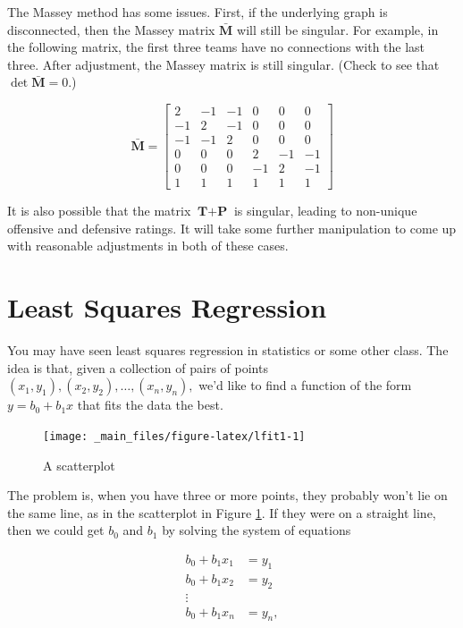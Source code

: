 \documentclass[
]{book}
\theoremstyle{definition}
\theoremstyle{definition}
\theoremstyle{definition}
\theoremstyle{definition}
\theoremstyle{remark}
\begin{document}
The Massey method has some issues. First, if the underlying graph is disconnected, then the Massey matrix \(\bar{\textbf{M}}\) will still be singular. For example, in the following matrix, the first three teams have no connections with the last three. After adjustment, the Massey matrix is still singular. (Check to see that \(\det \bar{\mathbf{M}}=0\).)

\[\bar{\mathbf{M}}=\left[\begin{array}{rrrrrr}2 & -1 & -1 & 0 & 0 & 0\\-1 & 2 & -1 & 0 & 0 & 0\\-1 & -1 & 2 & 0 & 0 & 0\\0 & 0 & 0 & 2 & -1 & -1\\0 & 0 & 0 & -1 & 2 & -1\\1 & 1 & 1 & 1 & 1 & 1\end{array}\right]
\]

It is also possible that the matrix \(\textbf{T}+\textbf{P}\) is singular, leading to non-unique offensive and defensive ratings. It will take some further manipulation to come up with reasonable adjustments in both of these cases.

\section{Least Squares Regression}\label{LSRSec}

You may have seen least squares regression in statistics or some other class. The idea is that, given a collection of pairs of points \((x_1,y_1),(x_2,y_2),\dots,(x_n,y_n),\) we'd like to find a function of the form \(y=b_0+b_1x\) that fits the data the best.

\begin{figure}

{\centering \texttt{[image: \_main\_files/figure-latex/lfit1-1]} 

}

\caption{A scatterplot}\label{fig:lfit1}
\end{figure}

The problem is, when you have three or more points, they probably won't lie on the same line, as in the scatterplot in Figure \ref{fig:lfit1}. If they were on a straight line, then we could get \(b_0\) and \(b_1\) by solving the system of equations

\begin{align*}
    b_0+b_1x_1&=y_1\\
    b_0+b_1x_2&=y_2\\
    \vdots &\\
    b_0+b_1x_n&=y_n,
\end{align*}
\end{document}
